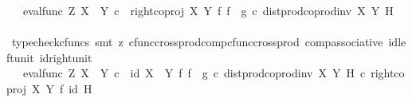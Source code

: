 \begin{isabellebody}
\ {\isachardoublequoteopen}{\isachardot}{\kern0pt}{\isachardot}{\kern0pt}{\isachardot}{\kern0pt}\ {\isacharequal}{\kern0pt}\ {\isacharparenleft}{\kern0pt}eval{\isacharunderscore}{\kern0pt}func\ Z\ {\isacharparenleft}{\kern0pt}X\ {\isasymCoprod}\ Y{\isacharparenright}{\kern0pt}\ {\isasymcirc}\isactrlsub c\ \ {\isacharparenleft}{\kern0pt}right{\isacharunderscore}{\kern0pt}coproj\ X\ Y\ {\isasymtimes}\isactrlsub f\ {\isacharparenleft}{\kern0pt}f\isactrlsup {\isasymflat}\ {\isasymamalg}\ g\isactrlsup {\isasymflat}\ {\isasymcirc}\isactrlsub c\ dist{\isacharunderscore}{\kern0pt}prod{\isacharunderscore}{\kern0pt}coprod{\isacharunderscore}{\kern0pt}inv{}\ X\ Y\ H{\isacharparenright}{\kern0pt}\isactrlsup {\isasymsharp}{\isacharparenright}{\kern0pt}{\isacharparenright}{\kern0pt}\isactrlsup {\isasymsharp}{\isachardoublequoteclose}\isanewline
\ \ \ \ \ \ \ \ \isamarkupfalse%
\ {\isacharparenleft}{\kern0pt}typecheck{\isacharunderscore}{\kern0pt}cfuncs{\isacharcomma}{\kern0pt}\ smt\ {\isacharparenleft}{\kern0pt}z{}{\isacharparenright}{\kern0pt}\ cfunc{\isacharunderscore}{\kern0pt}cross{\isacharunderscore}{\kern0pt}prod{\isacharunderscore}{\kern0pt}comp{\isacharunderscore}{\kern0pt}cfunc{\isacharunderscore}{\kern0pt}cross{\isacharunderscore}{\kern0pt}prod\ comp{\isacharunderscore}{\kern0pt}associative{}\ id{\isacharunderscore}{\kern0pt}left{\isacharunderscore}{\kern0pt}unit{}\ id{\isacharunderscore}{\kern0pt}right{\isacharunderscore}{\kern0pt}unit{}{\isacharparenright}{\kern0pt}\isanewline
\ \ \ \ \ \ \isamarkupfalse%
\ \isamarkupfalse%
\ {\isachardoublequoteopen}{\isachardot}{\kern0pt}{\isachardot}{\kern0pt}{\isachardot}{\kern0pt}\ {\isacharequal}{\kern0pt}\ {\isacharparenleft}{\kern0pt}eval{\isacharunderscore}{\kern0pt}func\ Z\ {\isacharparenleft}{\kern0pt}X\ {\isasymCoprod}\ Y{\isacharparenright}{\kern0pt}\ {\isasymcirc}\isactrlsub c\ \ {\isacharparenleft}{\kern0pt}id\ {\isacharparenleft}{\kern0pt}X\ {\isasymCoprod}\ Y{\isacharparenright}{\kern0pt}\ {\isasymtimes}\isactrlsub f\ {\isacharparenleft}{\kern0pt}f\isactrlsup {\isasymflat}\ {\isasymamalg}\ g\isactrlsup {\isasymflat}\ {\isasymcirc}\isactrlsub c\ dist{\isacharunderscore}{\kern0pt}prod{\isacharunderscore}{\kern0pt}coprod{\isacharunderscore}{\kern0pt}inv{}\ X\ Y\ H{\isacharparenright}{\kern0pt}\isactrlsup {\isasymsharp}{\isacharparenright}{\kern0pt}\ {\isasymcirc}\isactrlsub c\ {\isacharparenleft}{\kern0pt}right{\isacharunderscore}{\kern0pt}coproj\ X\ Y\ {\isasymtimes}\isactrlsub f\ id\ H{\isacharparenright}{\kern0pt}{\isacharparenright}{\kern0pt}\isactrlsup {\isasymsharp}{\isachardoublequoteclose}\isanewline

\end{isabellebody}
